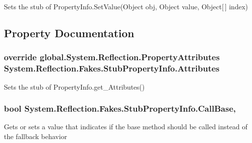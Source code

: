 Sets the stub of Property\-Info.\-Set\-Value(\-Object obj, Object value, Object\mbox{[}$\,$\mbox{]} index)



\subsection{Property Documentation}
\hypertarget{class_system_1_1_reflection_1_1_fakes_1_1_stub_property_info_ab90e680240d694c23f985cdde9e7aada}{
\subsubsection[{Attributes}]{\setlength{\rightskip}{0pt plus 5cm}override global.\-System.\-Reflection.\-Property\-Attributes System.\-Reflection.\-Fakes.\-Stub\-Property\-Info.\-Attributes\hspace{0.3cm}{\ttfamily [get]}}}\label{class_system_1_1_reflection_1_1_fakes_1_1_stub_property_info_ab90e680240d694c23f985cdde9e7aada}


Sets the stub of Property\-Info.\-get\-\_\-\-Attributes()

\hypertarget{class_system_1_1_reflection_1_1_fakes_1_1_stub_property_info_af715d54ea74286205c13e6d2b1011fdf}{
\subsubsection[{Call\-Base}]{\setlength{\rightskip}{0pt plus 5cm}bool System.\-Reflection.\-Fakes.\-Stub\-Property\-Info.\-Call\-Base\hspace{0.3cm}{\ttfamily [get]}, {\ttfamily [set]}}}\label{class_system_1_1_reflection_1_1_fakes_1_1_stub_property_info_af715d54ea74286205c13e6d2b1011fdf}


Gets or sets a value that indicates if the base method should be called instead of the fallback behavior

